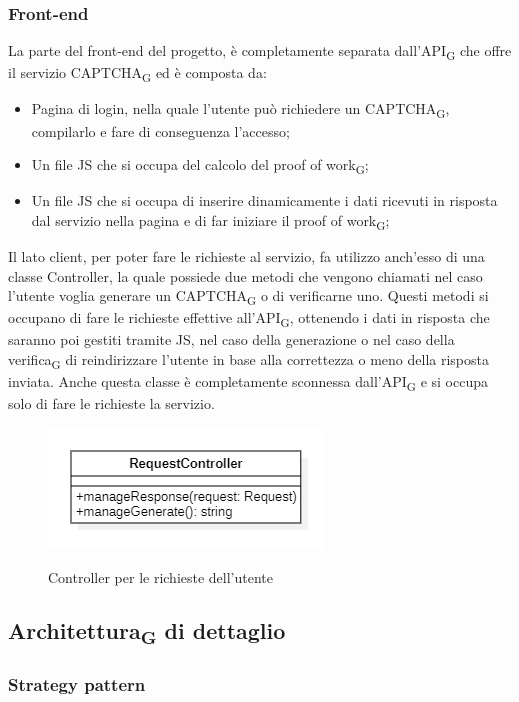 \subsubsection{Front-end}
La parte del front-end del progetto, è completamente separata dall'API\textsubscript{G} che offre il servizio CAPTCHA\textsubscript{G} ed è composta da:
\begin{itemize}
	\item Pagina di login, nella quale l'utente può richiedere un CAPTCHA\textsubscript{G}, 
    compilarlo e fare di conseguenza l'accesso;
    \item Un file JS che si occupa del calcolo del proof of work\textsubscript{G};
    \item Un file JS che si occupa di inserire dinamicamente i dati ricevuti in risposta dal servizio nella pagina e di far iniziare il proof of work\textsubscript{G};
\end{itemize}
Il lato client, per poter fare le richieste al servizio, fa utilizzo anch'esso di una classe Controller, la quale possiede due metodi che vengono chiamati nel caso l'utente voglia generare un CAPTCHA\textsubscript{G} o di verificarne uno. Questi metodi si occupano di fare le richieste effettive all'API\textsubscript{G}, ottenendo i dati in risposta che saranno poi gestiti tramite JS, nel caso della generazione o nel caso della verifica\textsubscript{G} di reindirizzare l'utente in base alla correttezza o meno della risposta inviata.
Anche questa classe è completamente sconnessa dall'API\textsubscript{G} e si occupa solo di fare le richieste la servizio. 

\begin{figure}[H]
	\centering
	\includegraphics[scale = 0.8]{img/request_controller.png}\\
	\caption{Controller per le richieste dell'utente}
\end{figure}

\subsection{Architettura\textsubscript{G} di dettaglio}

\subsubsection{Strategy pattern}

